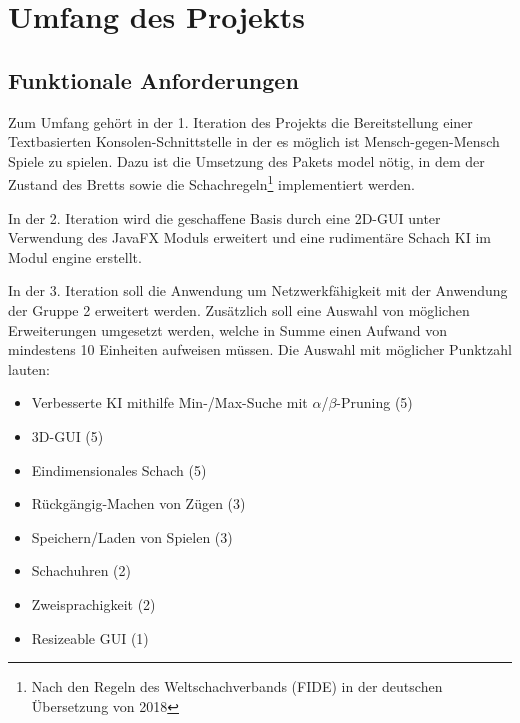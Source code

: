 \documentclass{scrreprt}
\begin{document}
\chapter{Umfang des Projekts}
\section{Funktionale Anforderungen}
Zum Umfang gehört in der 1. Iteration des Projekts die Bereitstellung einer Textbasierten Konsolen-Schnittstelle in der es möglich ist Mensch-gegen-Mensch Spiele zu spielen. Dazu ist die Umsetzung des Pakets model nötig, in dem der Zustand des Bretts sowie die Schachregeln\footnote{Nach den Regeln des Weltschachverbands (FIDE) in der deutschen Übersetzung von 2018} implementiert werden.

In der 2. Iteration wird die geschaffene Basis durch eine 2D-GUI unter Verwendung des JavaFX Moduls erweitert und eine rudimentäre Schach KI im Modul engine erstellt.

In der 3. Iteration soll die Anwendung um Netzwerkfähigkeit mit der Anwendung der Gruppe 2 erweitert werden. Zusätzlich soll eine Auswahl von möglichen Erweiterungen umgesetzt werden, welche in Summe einen Aufwand von mindestens 10 Einheiten aufweisen müssen. Die Auswahl mit möglicher Punktzahl lauten:

\begin{itemize}
\item Verbesserte KI mithilfe Min-/Max-Suche mit $\alpha$/$\beta$-Pruning (5)
\item 3D-GUI (5)
\item Eindimensionales Schach (5)
\item Rückgängig-Machen von Zügen (3)
\item Speichern/Laden von Spielen (3)
\item Schachuhren (2)
\item Zweisprachigkeit (2)
\item Resizeable GUI (1)
\end{itemize}
\end{document}
